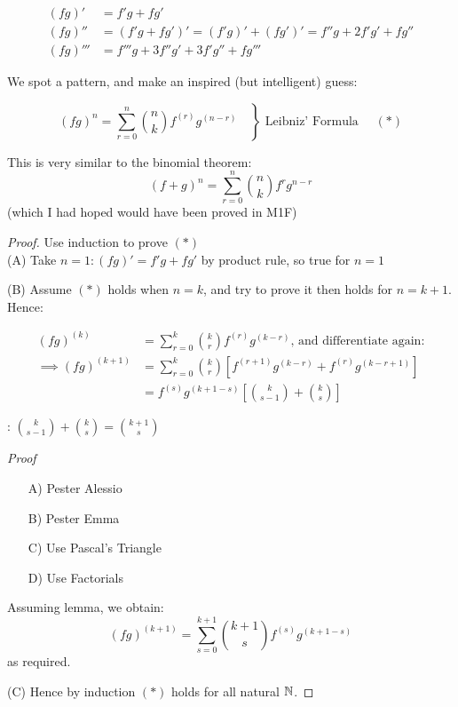 \documentclass[twoside]{scrartcl}
\begin{document}
\[
\begin{aligned}
  (fg)' &= f'g + fg'\\
(fg)'' &= (f'g + fg')' = (f'g)' + (fg')' = f''g + 2f'g' + fg''\\
(fg)''' &= f'''g + 3f''g' + 3f'g'' + fg'''
\end{aligned}
\]

We spot a pattern, and make an inspired (but intelligent) guess:


\[
(fg)^n = \left.\sum_{r=0}^n {n \choose k} f^{(r)}g^{(n-r)}
 \quad \right\} \text{ Leibniz' Formula } \quad (*)\]

This is very similar to the binomial theorem:\\
\[\displaystyle{
(f+g)^n = \sum_{r=0}^n {n \choose k} f^{r}g^{n-r}
}\] 
(which I had hoped would have been proved in M1F)

\begin{proof}
Use induction to prove $(*)$\\

(A) Take $n = 1: (fg)' = f'g + fg'$ by product rule, so true for $n=1$

(B) Assume $(*)$ holds when $n=k$, and try to prove it then holds for $n = k + 1$. Hence:

\[
\begin{aligned}
 (fg)^{(k)} &= \displaystyle{\sum_{r=0}^{k}{k \choose r}f^{(r)}g^{(k-r)} }\text{, and differentiate again:}\\
\implies (fg)^{(k+1)} &= \displaystyle{\sum_{r=0}^{k}{k \choose r} \left[f^{(r+1)}g^{(k-r)} + f^{(r)}g^{(k-r+1)} \right] }\\
& = \displaystyle{
f^{(s)}g^{(k+1-s)}\left[{k \choose s-1} + {k \choose s}\right]
}
\end{aligned}
\]\vspace*{5pt}

\begin{lemma}: $\displaystyle{ {k \choose s-1} + {k \choose s} = {k+1 \choose s} }$	
\end{lemma}

\textit{Proof}
\begin{itemize}
\item[A)] Pester Alessio
\item[B)] Pester Emma
\item[C)] Use Pascal's Triangle
\item[D)] Use Factorials
\end{itemize}

Assuming lemma, we obtain: \[(fg)^{(k+1)} = \displaystyle{\sum_{s=0}^{k+1}{k+1 \choose s}f^{(s)}g^{(k+1-s)} }\]as required. 

(C) Hence by induction $(*)$ holds for all natural $\mathbb{N}$.
\end{proof}
\end{document}
